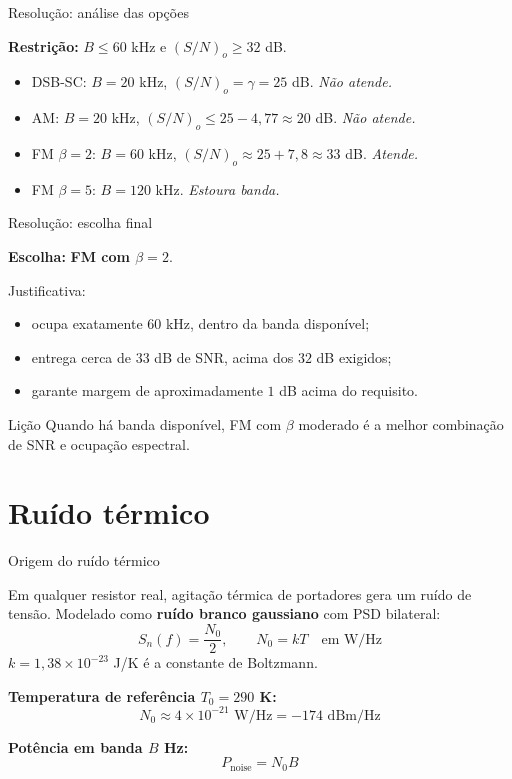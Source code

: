 
\begin{frame}{Resolução: análise das opções}

\textbf{Restrição:} $B \le 60$ kHz e $(S/N)_o \ge 32$ dB.

\begin{itemize}
\item DSB-SC: $B = 20$ kHz, $(S/N)_o = \gamma = 25$ dB. \emph{Não atende.}
\item AM: $B = 20$ kHz, $(S/N)_o \le 25 - 4{,}77 \approx 20$ dB. \emph{Não atende.}
\item FM $\beta = 2$: $B = 60$ kHz, $(S/N)_o \approx 25 + 7{,}8 \approx 33$ dB. \emph{Atende.}
\item FM $\beta = 5$: $B = 120$ kHz. \emph{Estoura banda.}
\end{itemize}

\end{frame}


\begin{frame}{Resolução: escolha final}

\textbf{Escolha:} \textbf{FM com $\beta = 2$}.

\vspace{0.3cm}

Justificativa:
\begin{itemize}
\item ocupa exatamente $60$ kHz, dentro da banda disponível;
\item entrega cerca de $33$ dB de SNR, acima dos $32$ dB exigidos;
\item garante margem de aproximadamente $1$ dB acima do requisito.
\end{itemize}

\begin{block}{Lição}
Quando há banda disponível, FM com $\beta$ moderado é a melhor combinação de SNR e ocupação espectral.
\end{block}

\end{frame}


\section{Ruído térmico}

\begin{frame}{Origem do ruído térmico}

Em qualquer resistor real, agitação térmica de portadores gera um ruído de tensão. Modelado como \textbf{ruído branco gaussiano} com PSD bilateral:
\[
S_n(f) = \frac{N_0}{2}, \qquad N_0 = kT \quad \text{em W/Hz}
\]
$k = 1{,}38\times 10^{-23}$ J/K é a constante de Boltzmann.

\textbf{Temperatura de referência $T_0 = 290$ K:}
\[
N_0 \approx 4 \times 10^{-21} \text{ W/Hz} = -174 \text{ dBm/Hz}
\]

\textbf{Potência em banda $B$ Hz:}
\[
P_{\text{noise}} = N_0 B
\]

\end{frame}


